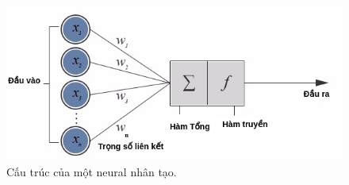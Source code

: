 \begin{figure}[ht]
  \begin{center}
    \leavevmode

    \includegraphics[scale=.7]{neuralart}
  
    \caption{Cấu trúc của một neural nhân tạo.} 
    \label{neural}
  \end{center}
\end{figure}

